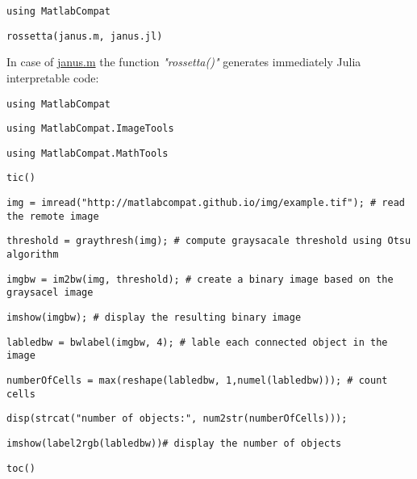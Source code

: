 \verb|using MatlabCompat|

\verb|rossetta(janus.m, janus.jl)|

In case of \href{https://github.com/MatlabCompat/MatlabCompat.jl/blob/dev/test/janus.m}{janus.m} the function \textit{"rossetta()"} generates immediately Julia interpretable code:

\verb|using MatlabCompat|

\verb|using MatlabCompat.ImageTools|

\verb|using MatlabCompat.MathTools|

\verb|tic()|

\verb|img = imread("http://matlabcompat.github.io/img/example.tif"); # read the remote image|

\verb|threshold = graythresh(img); # compute graysacale threshold using Otsu algorithm|

\verb|imgbw = im2bw(img, threshold); # create a binary image based on the graysacel image|

\verb|imshow(imgbw); # display the resulting binary image|

\verb|labledbw = bwlabel(imgbw, 4); # lable each connected object in the image|

\verb|numberOfCells = max(reshape(labledbw, 1,numel(labledbw))); # count cells|

\verb|disp(strcat("number of objects:", num2str(numberOfCells)));|

\verb|imshow(label2rgb(labledbw))# display the number of objects|

\verb|toc()|



  
  
  
  
  
  
  
  
